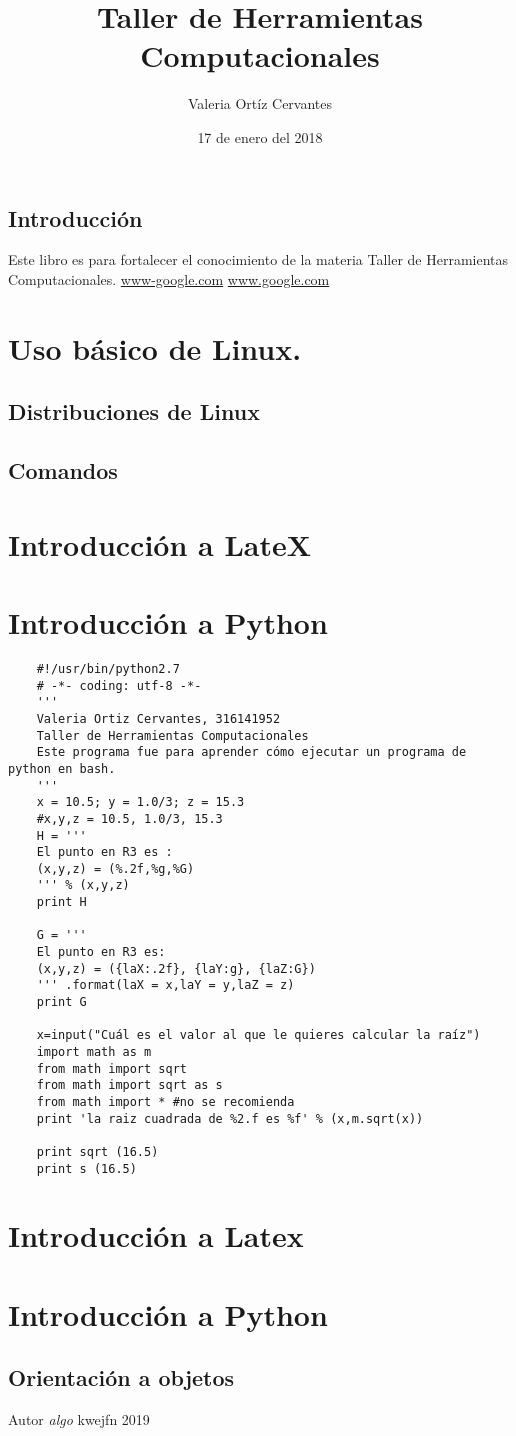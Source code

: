 \documentclass{book}
\title{Taller de Herramientas Computacionales}
\author{Valeria Ortíz Cervantes}
\date{17 de enero del 2018}
\begin{document}
\maketitle
\tableofcontents
\section*{Introducción}Este libro es para fortalecer el conocimiento de la materia Taller de Herramientas Computacionales.
\url{www-google.com}
\hyperref[Google]{www.google.com}
\chapter{Uso básico de Linux.}
\section{Distribuciones de Linux}
\section{Comandos}
\chapter {Introducción a LateX}
\chapter{Introducción a Python}
\begin{verbatim}
	#!/usr/bin/python2.7
	# -*- coding: utf-8 -*-
	'''
	Valeria Ortiz Cervantes, 316141952
	Taller de Herramientas Computacionales
	Este programa fue para aprender cómo ejecutar un programa de python en bash.
	''' 
	x = 10.5; y = 1.0/3; z = 15.3
	#x,y,z = 10.5, 1.0/3, 15.3
	H = '''
	El punto en R3 es :
	(x,y,z) = (%.2f,%g,%G)
	''' % (x,y,z) 
	print H
	
	G = '''
	El punto en R3 es:
	(x,y,z) = ({laX:.2f}, {laY:g}, {laZ:G})
	''' .format(laX = x,laY = y,laZ = z)
	print G
	
	x=input("Cuál es el valor al que le quieres calcular la raíz")
	import math as m
	from math import sqrt
	from math import sqrt as s
	from math import * #no se recomienda
	print 'la raiz cuadrada de %2.f es %f' % (x,m.sqrt(x))
	
	print sqrt (16.5)
	print s (16.5)
\end{verbatim}

%

\chapter{Introducción a Latex}
\chapter{Introducción a Python}
\section*{Orientación a objetos}

\begin{thebibliography}{9}
	Autor 
	\textit{algo}
	kwejfn 2019
\end{thebibliography}
\end{document}

